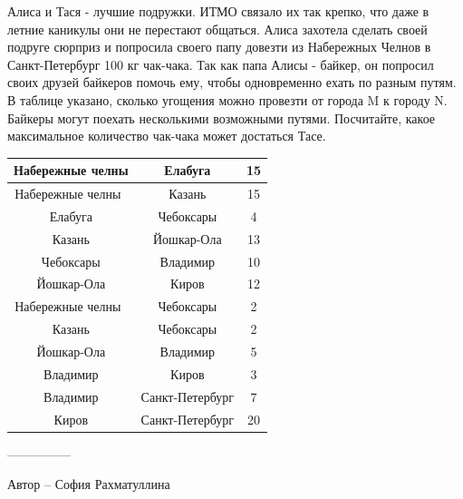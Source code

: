 \question
Алиса и Тася - лучшие подружки. ИТМО связало их так крепко, что даже в летние каникулы они не перестают общаться. Алиса захотела сделать своей подруге сюрприз и попросила своего папу довезти из Набережных Челнов в Санкт-Петербург 100 кг чак-чака. Так как папа Алисы - байкер, он попросил своих друзей байкеров помочь ему, чтобы одновременно ехать по разным путям. В таблице указано, сколько угощения можно провезти от города M к городу N. Байкеры могут поехать несколькими возможными путями. Посчитайте, какое максимальное количество чак-чака может достаться Тасе.

\begin{center}
\begin{tabular}{| c | c | c |}
\hline
Набережные челны & Елабуга & 15\\
\hline
Набережные челны  & Казань & 15\\
\hline
Елабуга & Чебоксары & 4\\
\hline
Казань & Йошкар-Ола & 13\\
\hline
Чебоксары & Владимир & 10\\
\hline
Йошкар-Ола & Киров & 12\\
\hline
Набережные челны  & Чебоксары & 2\\
\hline
Казань & Чебоксары & 2\\
\hline
 Йошкар-Ола & Владимир &5\\\hline
 Владимир & Киров &3\\\hline
 Владимир & Санкт-Петербург &7\\\hline
 Киров & Санкт-Петербург &20\\\hline

\end{tabular}
\end{center}

---------------

Автор -- София Рахматуллина